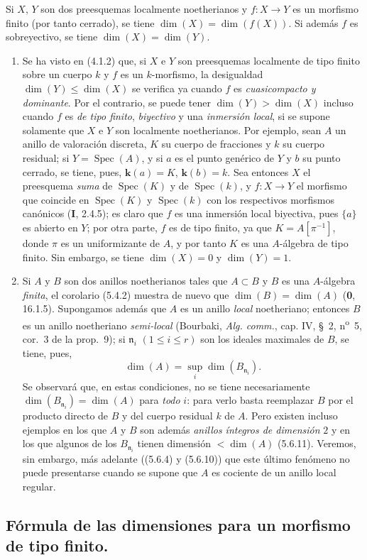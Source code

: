 \begin{corollary}[5.4.2]
\label{IV.2.s5.4.2-fr}
Si $X$, $Y$ son dos preesquemas localmente noetherianos y $f:X\to Y$ es un
morfismo finito \textup{(por tanto} cerrado\textup{)}, se tiene
$\dim(X)=\dim(f(X))$. Si además $f$ es sobreyectivo, se tiene
$\dim(X)=\dim(Y)$.
\end{corollary}

\begin{remarks}[5.4.3]
\label{IV.2.s5.4.3-fr}
\begin{enumerate}
\item[(i)] Se ha visto en (4.1.2) que, si $X$ e $Y$ son preesquemas
localmente de tipo finito sobre un cuerpo $k$ y $f$ es un $k$-morfismo, la
desigualdad $\dim(Y)\leq\dim(X)$ se verifica ya cuando $f$ es \emph{cuasicompacto y
dominante}. Por el contrario, se puede tener $\dim(Y)>\dim(X)$ incluso cuando
$f$ es \emph{de tipo finito}, \emph{biyectivo} y una \emph{inmersión local}, si se supone solamente
que $X$ e $Y$ son localmente noetherianos. Por ejemplo, sean $A$ un anillo de
valoración discreta, $K$ su cuerpo de fracciones y $k$ su cuerpo residual; si
$Y=\operatorname{Spec}(A)$, y si $a$ es el punto genérico de $Y$ y $b$ su
punto cerrado, se tiene, pues, $\boldsymbol{k}(a)=K$, $\boldsymbol{k}(b)=k$. Sea entonces $X$ el
preesquema \emph{suma} de $\operatorname{Spec}(K)$ y de $\operatorname{Spec}(k)$, y
$f:X\to Y$ el morfismo que coincide en $\operatorname{Spec}(K)$ y
$\operatorname{Spec}(k)$ con los respectivos morfismos canónicos (\textbf I, 2.4.5);
es claro que $f$ es una inmersión local biyectiva, pues $\{a\}$ es abierto en
$Y$; por otra parte, $f$ es de tipo finito, ya que $K=A[\pi^{-1}]$, donde
$\pi$ es un uniformizante de $A$, y por tanto $K$ es una $A$-álgebra de tipo
finito. Sin embargo, se tiene $\dim(X)=0$ y $\dim(Y)=1$.

\item[(ii)] Si $A$ y $B$ son dos anillos noetherianos tales que $A\subset B$
y $B$ es una $A$-álgebra \emph{finita}, el corolario (5.4.2) muestra de nuevo que
$\dim(B)=\dim(A)$ (\textbf 0, 16.1.5). Supongamos además que $A$ es un anillo \emph{local}
noetheriano; entonces $B$ es un anillo noetheriano \emph{semi-local} (Bourbaki,
\emph{Alg. comm.}, cap. IV, \S~2, n\textsuperscript{o}~5, cor.~3 de la
prop.~9); si $\mathfrak n_i$ $(1\leq i\leq r)$ son los ideales maximales de
$B$, se tiene, pues,
\begin{equation}
\dim(A)=\sup_i\dim(B_{\mathfrak n_i}).
\tag{5.4.3.1}\label{IV.2.s5.4.3.1-fr}
\end{equation}
Se observará que, en estas condiciones, no se tiene necesariamente
$\dim(B_{\mathfrak n_i})=\dim(A)$ para \emph{todo} $i$: para verlo basta reemplazar
$B$ por el producto directo de $B$ y del cuerpo residual $k$ de $A$. Pero
existen incluso ejemplos en los que $A$ y $B$ son además \emph{anillos íntegros de
dimensión} $2$ y en los que algunos de los $B_{\mathfrak n_i}$ tienen dimensión
$<\dim(A)$ (5.6.11). Veremos, sin embargo, más adelante ((5.6.4) y (5.6.10))
que este último fenómeno no puede presentarse cuando se supone que $A$ es
cociente de un anillo local regular.
\end{enumerate}
\end{remarks}

\subsection{Fórmula de las dimensiones para un morfismo de tipo finito.}
\label{IV.2.s5.5-fr}
